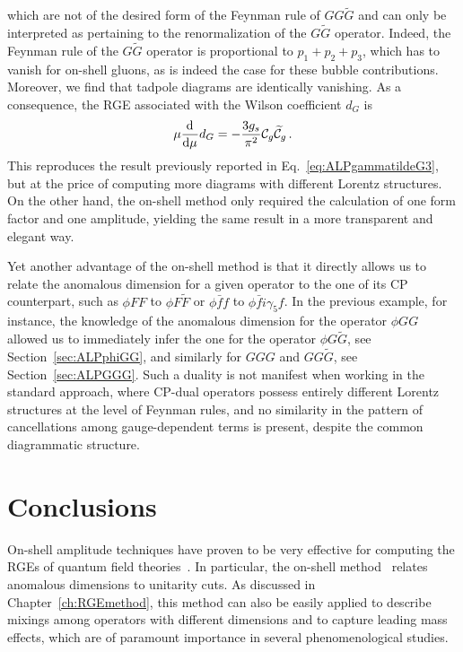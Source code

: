 which are not of the desired form of the Feynman rule of $GG\widetilde G$ and can only be
interpreted as pertaining to the renormalization of the $G\widetilde G$ operator.
Indeed, the Feynman rule of the $G\widetilde G$ operator is proportional to $p_1+p_2+p_3$,
which has to vanish for on-shell gluons, as is indeed the case for these bubble contributions.
Moreover, we find that tadpole diagrams are identically vanishing.
As a consequence, the RGE associated with the Wilson coefficient $d_G$ is
\begin{equation}
    \mu\dv[]{}{\mu}d_G = -\frac{3g_s}{\pi^2}\mathcal C_g \widetilde{\mathcal C}_g\,.
\end{equation}
This reproduces the result previously reported in Eq.~\eqref{eq:ALPgammatildeG3}, but at the
price of computing more diagrams with different Lorentz structures.
On the other hand, the on-shell method only required the calculation of one form factor and one
amplitude, yielding the same result in a more transparent and elegant way.

Yet another advantage of the on-shell method is that it directly allows us to relate the
anomalous dimension for a given operator to the one of its CP counterpart, such as $\phi FF$ to
$\phi F \widetilde F$ or
$\phi \bar f f$ to $\phi \bar f i \gamma_5 f$.
In the previous example, for instance, the knowledge of the anomalous dimension for the
operator $\phi GG$ allowed us to immediately infer the one for the operator
$\phi G\widetilde G$, see Section~\ref{sec:ALPphiGG}, and similarly for $GGG$ and
$GG \widetilde{G}$, see Section~\ref{sec:ALPGGG}.
Such a duality is not manifest when working in the standard approach, where CP-dual operators
possess entirely different Lorentz structures at the level of Feynman rules, and no similarity
in the pattern of cancellations among gauge-dependent terms is present, despite the common
diagrammatic structure.

\section{Conclusions}
\label{sec:ALPconclusions}

On-shell amplitude techniques have proven to be very effective for computing the RGEs of quantum field theories~\cite{Caron-Huot:2016cwu,EliasMiro:2020tdv,Baratella:2020lzz,Jiang:2020mhe,Bern:2020ikv,Baratella:2020dvw,AccettulliHuber:2021uoa,EliasMiro:2021jgu,Baratella:2022nog,Machado:2022ozb}. 
In particular, the on-shell method~\cite{Caron-Huot:2016cwu} relates anomalous dimensions to unitarity cuts. 
As discussed in Chapter~\ref{ch:RGEmethod}, this method can also be easily applied to describe mixings among operators with different dimensions 
and to capture leading mass effects, which are of paramount importance in several phenomenological studies.

